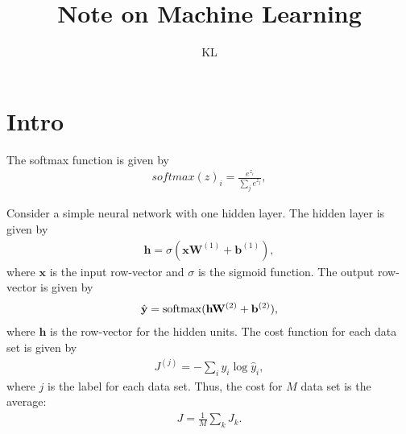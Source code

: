 \documentclass[10pt,letterpaper]{article}
\author{KL}
\begin{document}
\title{Note on Machine Learning}
\maketitle
\section{Intro}
The softmax function is given by
\begin{align}
	softmax(z)_i = \frac{e^{z_i}}{\sum_j e^{z_j}},
\end{align}

Consider a simple neural network with one hidden layer. The hidden layer is given by
\begin{align}
\mathbf{h} = \sigma( \mathbf{x}\mathbf{W}^{(1)} + \mathbf{b}^{(1)}),
\end{align}
where $\mathbf{x}$ is the input row-vector and $\sigma$ is the sigmoid function. The output row-vector is given by
\begin{align}
\hat{\mathbf{y}} = {\rm softmax}(\mathbf{h}\mathbf{W}^{(2)}+\mathbf{b}^{(2)}),
\end{align}
where $\mathbf{h}$ is the row-vector for the hidden units. The cost function for each data set is given by
\begin{align}
J^{(j)} = -\sum_{i} y_i \log \hat{y}_i,
\end{align}
where $j$ is the label for each data set.  Thus, the cost for $M$ data set is the average:
\begin{align}
J = \frac{1}{M}\sum_k J_k.
\end{align}
\end{document}
